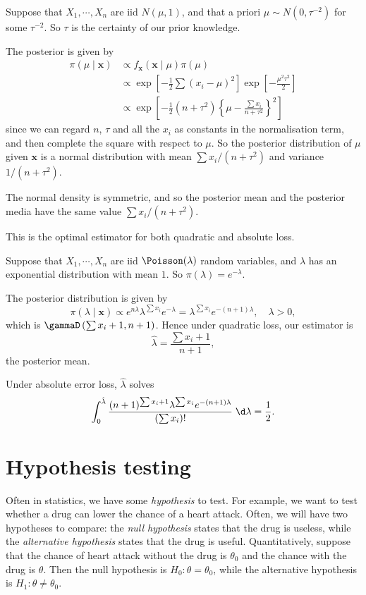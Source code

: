 \documentclass[a4paper]{article}
\begin{document}
\begin{eg}
  Suppose that $X_1, \cdots , X_n$ are iid $N(\mu, 1)$, and that a priori $\mu\sim N(0, \tau^{-2})$ for some $\tau^{-2}$. So $\tau$ is the certainty of our prior knowledge.

  The posterior is given by
  \begin{align*}
    \pi(\mu\mid \mathbf{x})&\propto f_\mathbf{x}(\mathbf{x}\mid \mu)\pi(\mu)\\
    &\propto \exp\left[-\frac{1}{2}\sum(x_i - \mu)^2\right]\exp\left[-\frac{\mu^2\tau^2}{2}\right]\\
    &\propto \exp\left[-\frac{1}{2}(n + \tau^2)\left\{\mu - \frac{\sum x_i}{n + \tau^2}\right\}^2\right]
  \end{align*}
  since we can regard $n$, $\tau$ and all the $x_i$ as constants in the normalisation term, and then complete the square with respect to $\mu$. So the posterior distribution of $\mu$ given $\mathbf{x}$ is a normal distribution with mean $\sum x_i/(n + \tau^2)$ and variance $1/(n + \tau^2)$.

  The normal density is symmetric, and so the posterior mean and the posterior media have the same value $\sum x_i/(n + \tau^2)$.
  
  This is the optimal estimator for both quadratic and absolute loss.
\end{eg}

\begin{eg}
  Suppose that $X_1, \cdots, X_n$ are iid $\Poisson(\lambda)$ random variables, and $\lambda$ has an exponential distribution with mean $1$. So $\pi(\lambda) = e^{-\lambda}.$

  The posterior distribution is given by
  \[
    \pi(\lambda\mid \mathbf{x}) \propto e^{n\lambda} \lambda^{\sum x_i}e^{-\lambda} = \lambda^{\sum x_i}e^{-(n + 1)\lambda},\quad \lambda > 0,
  \]
  which is $\gammaD\left(\sum x_i + 1, n + 1\right)$. Hence under quadratic loss, our estimator is
  \[
    \hat{\lambda} = \frac{\sum x_i + 1}{n + 1},
  \]
  the posterior mean.

  Under absolute error loss, $\hat{\lambda}$ solves
  \[
    \int_0^{\hat{\lambda}} \frac{(n + 1)^{\sum x_i + 1}\lambda^{\sum x_i}e ^{-(n + 1)\lambda}}{\left(\sum x_i\right)!}\;\d \lambda = \frac{1}{2}.
  \]
\end{eg}

\section{Hypothesis testing}
Often in statistics, we have some \emph{hypothesis} to test. For example, we want to test whether a drug can lower the chance of a heart attack. Often, we will have two hypotheses to compare: the \emph{null hypothesis} states that the drug is useless, while the \emph{alternative hypothesis} states that the drug is useful. Quantitatively, suppose that the chance of heart attack without the drug is $\theta_0$ and the chance with the drug is $\theta$. Then the null hypothesis is $H_0: \theta = \theta_0$, while the alternative hypothesis is $H_1: \theta \not= \theta_0$.
\end{document}
